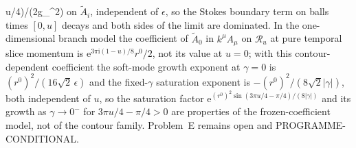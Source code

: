 u/4)/(2g_{}^2)\) on \(\tilde A_i\), independent of \(\epsilon\), so the Stokes boundary term on balls times \([0,u]\) decays and both sides of the limit are dominated. In the one-dimensional branch model the coefficient of \(\tilde A_0\) in \(k^\mu A_\mu\) on \(\mathcal R_u\) at pure temporal slice momentum is \(\mathrm e^{3\pi\mathrm i(1-u)/8}r^0/2\), not its value at \(u=0\); with this contour-dependent coefficient the soft-mode growth exponent at \(\gamma=0\) is \({(r^0)}^2/(16\sqrt2\,\epsilon)\) and the fixed-\(\gamma\) saturation exponent is \(-{(r^0)}^2/(8\sqrt2|\gamma|)\), both independent of \(u\), so the saturation factor \(\mathrm e^{{(r^0)}^2\sin(3\pi u/4-\pi/4)/(8|\gamma|)}\) and its growth as \(\gamma\to0^-\) for \(3\pi u/4-\pi/4>0\) are properties of the frozen-coefficient model, not of the contour family. Problem~E remains open and PROGRAMME-CONDITIONAL.
